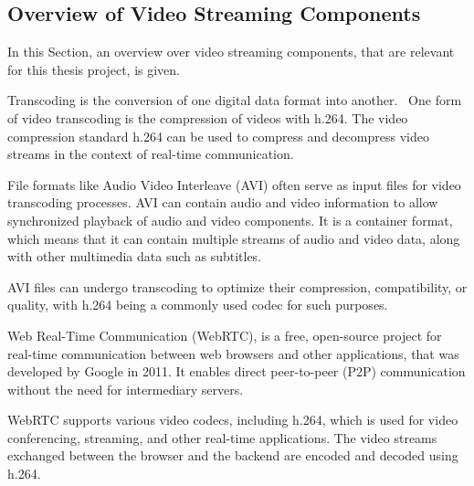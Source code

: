 \documentclass[../MasterThesis.tex]{subfiles}
\begin{document}
\subsection{Overview of Video Streaming Components}
\label{subsection_OverviewVideoStreamingComponents}

In this Section, an overview over video streaming components, that are relevant for this thesis project, is given.

Transcoding is the conversion of one digital data format into another.~\cite{transcoding}
One form of video transcoding is the compression of videos with h.264.
The video compression standard h.264 can be used to compress and decompress video streams in the context of real-time communication.~\cite{transcoding, h264}
	

File formats like Audio Video Interleave (AVI) often serve as input files for video transcoding processes.
AVI can contain audio and video information to allow synchronized playback of audio and video components. 
It is a container format, which means that it can contain multiple streams of audio and video data, along with other multimedia data such as subtitles.~\cite{avi}


AVI files can undergo transcoding to optimize their compression, compatibility, or quality, with h.264 being a commonly used codec for such purposes.~\cite{h264}


Web Real-Time Communication (WebRTC), is a free, open-source project for real-time communication between web browsers and other applications, that was developed by Google in 2011. It enables direct peer-to-peer (P2P) communication without the need for intermediary servers.~\cite{webrtc}
	

WebRTC supports various video codecs, including h.264, which is used for video conferencing, streaming, and other real-time applications. The video streams exchanged between the browser and the backend are encoded and decoded using h.264.~\cite{h264}





\end{document}
